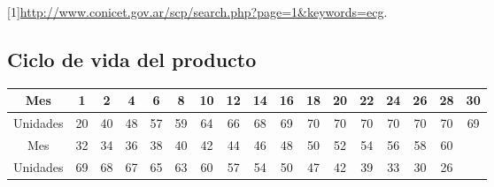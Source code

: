 \documentclass[12pt]{article}
\numberwithin{equation}{section}
\numberwithin{figure}{section}
\numberwithin{table}{section}
\begin{document}
[1]\href{http://www.conicet.gov.ar/scp/search.php?page=1&keywords=ecg}{http://www.conicet.gov.ar/scp/search.php?page=1\&keywords=ecg}.

\subsection{Ciclo de vida del producto}


\begin{tabular}{c | c | c | c | c | c | c | c | c | c | c | c | c | c | c | c | c | }
   Mes & 1 & 2 & 4 & 6 & 8 & 10 & 12 & 14 & 16 & 18 & 20 & 22 & 24 & 26 & 28 & 30\\
   \hline
   Unidades & 20 & 40 & 48 & 57 & 59 & 64 & 66 & 68 & 69 & 70 & 70 & 70 & 70 & 70 & 70 & 69\\
	\hline
   Mes  & 32 & 34 & 36 & 38 & 40 & 42 & 44 & 46 & 48 & 50 & 52 & 54 & 56 & 58 & 60 \\
	\hline
   Unidades  & 69 & 68 & 67 & 65 & 63 & 60 & 57 & 54 & 50 & 47 & 42 & 39 & 33 & 30 & 26 \\
\end{tabular}
\end{document}
